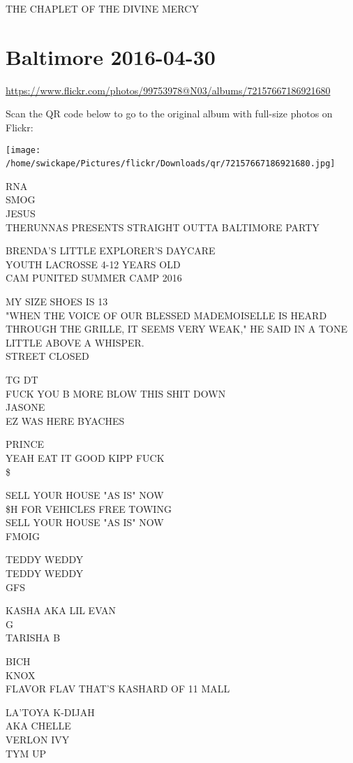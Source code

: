 \documentclass[10pt,letterpaper]{article}
\begin{document}
THE CHAPLET OF THE DIVINE MERCY
\

\section*{Baltimore 2016-04-30}

\url{https://www.flickr.com/photos/99753978@N03/albums/72157667186921680}

Scan the QR code below to go to the original album with full-size photos on Flickr:

\texttt{[image: /home/swickape/Pictures/flickr/Downloads/qr/72157667186921680.jpg]}
\

RNA\\
SMOG\\
JESUS\\
THERUNNAS PRESENTS STRAIGHT OUTTA BALTIMORE PARTY

BRENDA'S LITTLE EXPLORER'S DAYCARE\\
YOUTH LACROSSE 4{-}12 YEARS OLD\\
CAM PUNITED SUMMER CAMP 2016

MY SIZE SHOES IS 13\\
"WHEN THE VOICE OF OUR BLESSED MADEMOISELLE IS HEARD THROUGH THE GRILLE, IT SEEMS VERY WEAK," HE SAID IN A TONE LITTLE ABOVE A WHISPER.\\
STREET CLOSED

TG DT\\
FUCK YOU B MORE BLOW THIS SHIT DOWN\\
JASONE\\
EZ WAS HERE BYACHES

PRINCE\\
YEAH EAT IT GOOD KIPP FUCK\\
\$

SELL YOUR HOUSE "AS IS" NOW\\
\$H FOR VEHICLES FREE TOWING\\
SELL YOUR HOUSE "AS IS" NOW\\
FMOIG

TEDDY WEDDY\\
TEDDY WEDDY\\
GFS

KASHA AKA LIL EVAN\\
G\\
TARISHA B

BICH\\
KNOX\\
FLAVOR FLAV THAT'S KASHARD OF 11 MALL

LA'TOYA K{-}DIJAH\\
AKA CHELLE\\
VERLON IVY\\
TYM UP
\end{document}
